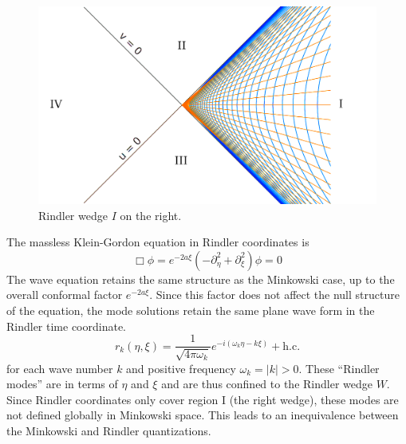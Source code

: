 \documentclass[12pt,a4paper]{article}
\begin{document}
\begin{figure}[h]
\centering
\includegraphics[scale=0.2]{rindler_w.png}
\caption{Rindler wedge $I$ on the right.}
\label{rindlerw}
\end{figure}

The massless Klein-Gordon equation in Rindler coordinates is
\begin{equation}
  \Box \phi = e^{-2a \xi}(-\partial_\eta^2 + \partial_\xi^2) \phi = 0
\end{equation}
The wave equation retains the same structure as the Minkowski case, up to the overall conformal factor $e^{-2a\xi}$. Since this factor does not affect the null structure of the equation, the mode solutions retain the same plane wave form in the Rindler time coordinate.
\begin{equation}
 r_k(\eta,\xi) = \frac{1}{\sqrt{4 \pi \omega_k}} e^{-i(\omega_k \eta -k \xi)} + \text{h.c.}
\end{equation}
for each wave number $k$ and positive frequency $\omega_k = |k| > 0$.  These ``Rindler modes'' are in terms of $\eta$ and $\xi$ and are thus confined to the Rindler wedge $W$.  Since Rindler coordinates only cover region I (the right wedge), these modes are not defined globally in Minkowski space. This leads to an inequivalence between the Minkowski and Rindler quantizations.
\end{document}
